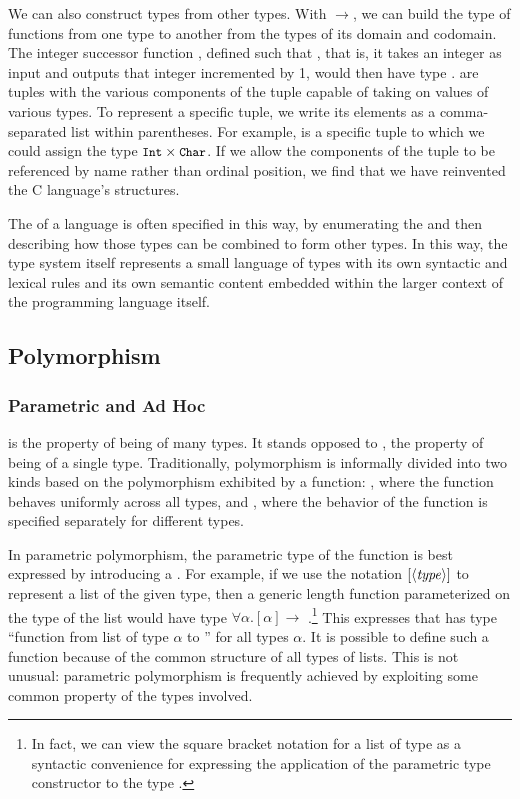 We can also construct types from other types. With $\to$, we can build the type of functions from one type to another from the types of its domain and codomain. The integer successor function , defined such that , that is, it takes an integer as input and outputs that integer incremented by 1, would then have type .  are tuples with the various components of the tuple capable of taking on values of various types. To represent a specific tuple, we write its elements as a comma-separated list within parentheses. For example,  is a specific tuple to which we could assign the type $\text{{\small\ttfamily Int}} \times \text{{\small\ttfamily Char}}$. If we allow the components of the tuple to be referenced by name rather than ordinal position, we find that we have reinvented the C language's structures.

The  of a language is often specified in this way, by enumerating the  and then describing how those types can be combined to form other types. In this way, the type system itself represents a small language of types with its own syntactic and lexical rules and its own semantic content embedded within the larger context of the programming language itself.

\subsection{Polymorphism}
\subsubsection{Parametric and Ad Hoc}
 is the property of being of many types. It stands opposed to , the property of being of a single type. Traditionally, polymorphism is informally divided into two kinds based on the polymorphism exhibited by a function: , where the function behaves uniformly across all types, and , where the behavior of the function is specified separately for different types.

In parametric polymorphism, the parametric type of the function is best expressed by introducing a . For example, if we use the notation $[\langle \text{\textit{type}} \rangle]$ to represent a list of the given type, then a generic length function parameterized on the type of the list would have type $\forall \alpha. [\alpha] \to$ .\footnote{In fact, we can view the square bracket notation \code{[T]} for a list of type  as a syntactic convenience for expressing the application of the parametric type constructor  to the type .} This expresses that  has type ``function from list of type $\alpha$ to '' for all types $\alpha$. It is possible to define such a function because of the common structure of all types of lists. This is not unusual: parametric polymorphism is frequently achieved by exploiting some common property of the types involved.

